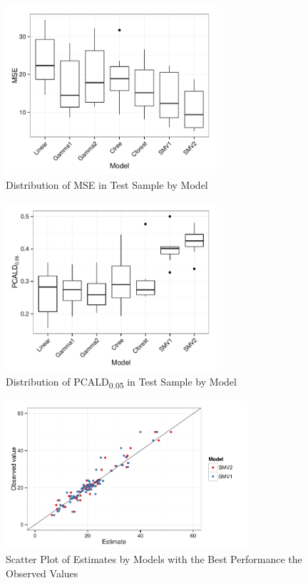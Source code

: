 \documentclass[10pt, letterpaper ]{article}
\begin{document}




\begin{figure}[H]
\centering
\includegraphics[width=0.7\textwidth]{figures/mse.pdf}
\caption{Distribution of MSE in Test Sample by Model }
\label{fig:mse}
\end{figure}


\begin{figure}[H]
\centering
\includegraphics[width=0.7\textwidth]{figures/prop05.pdf}
\caption{Distribution of PCALD\textsubscript{0.05} in Test Sample by Model}
\label{fig:prop05}
\end{figure}



\begin{figure}[H]
	\centering
	\includegraphics[width=0.8\textwidth]{figures/comparison.pdf}
	\caption{Scatter Plot of Estimates by Models with the Best Performance the Observed Values}
	\label{fig:comparison}
\end{figure}
\end{document}

